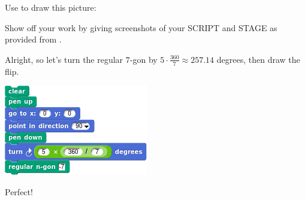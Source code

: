 \documentclass[noauthor,nooutcomes,12pt]{ximera}
\begin{document}
\begin{question}
  Use   to draw this picture:
  \begin{center}
  \end{center}
  Show off your work by giving screenshots of your SCRIPT and STAGE as
  provided from \snap.
  \begin{freeResponse}
    Alright, so let's turn the regular $7$-gon by $5\cdot \frac{360}{7}\approx 257.14$ degrees, then draw the flip.
    \begin{center}
      \includegraphics[width=.3\textwidth]{sevenGonBasicSCRIPT.png}   \qquad {}
    \end{center}
    Perfect!
  \end{freeResponse}
\end{question}
\end{document}
